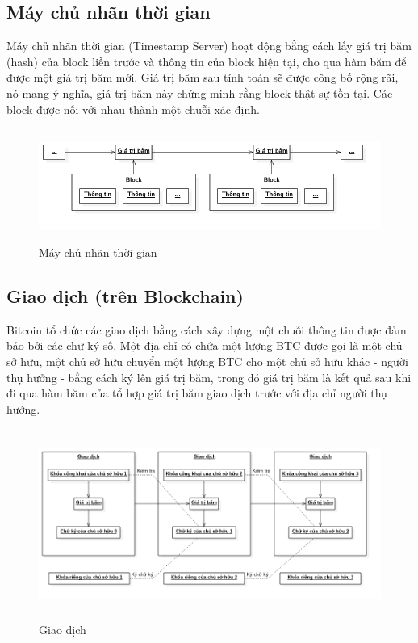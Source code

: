 \subsection{Máy chủ nhãn thời gian}
Máy chủ nhãn thời gian (Timestamp Server) hoạt động bằng cách lấy giá trị băm 
(hash) của block liền trước và thông tin của block hiện tại, cho qua hàm băm 
để được một giá trị băm mới. Giá trị băm sau tính toán sẽ được công bố rộng rãi, 
nó mang ý nghĩa, giá trị băm này chứng minh rằng block thật sự tồn tại. Các 
block được nối với nhau thành một chuỗi xác định.\\
\begin{figure}[h!]
\centering
\includegraphics[height=1.45in, keepaspectratio=true]{timestampserver.png}
\caption{Máy chủ nhãn thời gian}
\end{figure}
\subsection{Giao dịch (trên Blockchain)}
Bitcoin tổ chức các giao dịch bằng cách xây dựng một chuỗi thông tin được đảm 
bảo bởi các chữ ký số. Một địa chỉ có chứa một lượng BTC được gọi là một chủ 
sở hữu, một chủ sở hữu chuyển một lượng BTC cho một chủ sở hữu khác - người thụ 
hưởng - bằng cách ký lên giá trị băm, trong đó giá trị băm là kết quả sau khi 
đi qua hàm băm của tổ hợp giá trị băm giao dịch trước với địa chỉ người thụ 
hưởng.\\
\begin{figure}[h!]
\centering
\includegraphics[height=2.45in, keepaspectratio=true]{transaction.png}
\caption{Giao dịch}
\end{figure}
